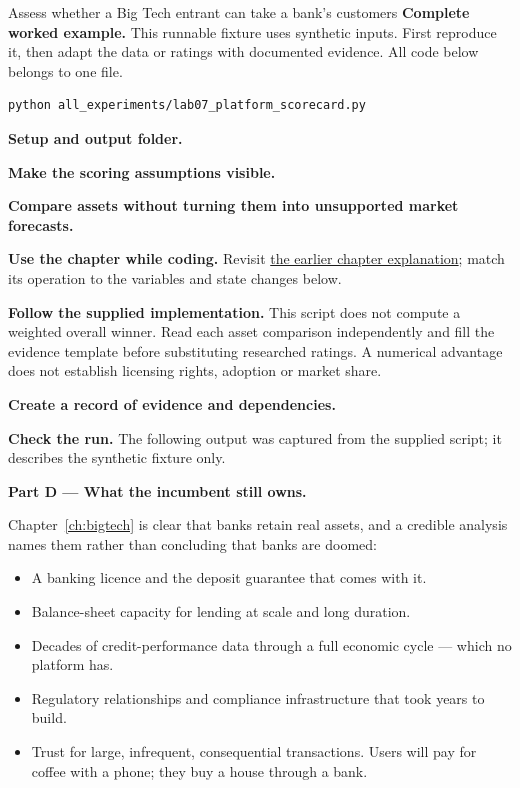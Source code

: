 \begin{labproject}{Assess whether a Big Tech entrant can take a bank's customers}
\textbf{Complete worked example.} This runnable fixture uses synthetic inputs. First reproduce it, then adapt the data or ratings with documented evidence. All code below belongs to one file.
\begin{lstlisting}[style=utpterminal]
python all_experiments/lab07_platform_scorecard.py
\end{lstlisting}

\noindent\textbf{Setup and output folder.}


\noindent\textbf{Make the scoring assumptions visible.}


\noindent\textbf{Compare assets without turning them into unsupported market forecasts.}



\textbf{Use the chapter while coding.} Revisit \hyperref[ch:bigtech]{the earlier chapter explanation}; match its operation to the variables and state changes below.

\textbf{Follow the supplied implementation.} This script does not compute a weighted overall winner. Read each asset comparison independently and fill the evidence template before substituting researched ratings. A numerical advantage does not establish licensing rights, adoption or market share.




\noindent\textbf{Create a record of evidence and dependencies.}


\textbf{Check the run.} The following output was captured from the supplied script; it describes the synthetic fixture only.



\medskip\noindent\textbf{Part D --- What the incumbent still owns.}\par
Chapter~\ref{ch:bigtech} is clear that banks retain real assets, and a credible analysis names them rather than concluding that banks are doomed:

\begin{itemize}
  \item A banking licence and the deposit guarantee that comes with it.
  \item Balance-sheet capacity for lending at scale and long duration.
  \item Decades of credit-performance data through a full economic cycle --- which no platform has.
  \item Regulatory relationships and compliance infrastructure that took years to build.
  \item Trust for large, infrequent, consequential transactions. Users will pay for coffee with a phone; they buy a house through a bank.
\end{itemize}


\end{labproject}
